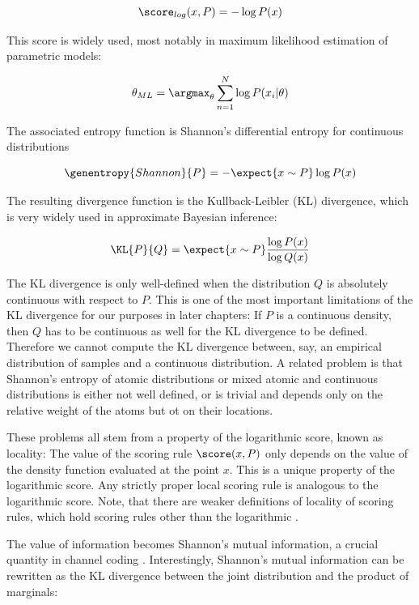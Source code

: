 \begin{equation}
	\score_{log}(x,P) = - \log P(x) 
\end{equation}

This score is widely used, most notably in maximum likelihood estimation of parametric models:

\begin{equation}
	\theta_{ML} = \argmax_{\theta} \sum_{n=1}^{N} \log P(x_i \vert \theta)
\end{equation}

The associated entropy function is Shannon's differential entropy for continuous distributions

\begin{equation}
	\genentropy{Shannon}{P} = - \expect{x\sim P} \log P(x)
\end{equation}

The resulting divergence function is the Kullback-Leibler (KL) divergence, which is very widely used in approximate Bayesian inference:

\begin{equation}
	\KL{P}{Q} = \expect{x\sim P} \frac{\log P(x)}{\log Q(x)}
\end{equation}

The KL divergence is only well-defined when the distribution $Q$ is absolutely continuous with respect to $P$. This is one of the most important limitations of the KL divergence for our purposes in later chapters: If $P$ is a continuous density, then $Q$ has to be continuous as well for the KL divergence to be defined. Therefore we cannot compute the KL divergence between, say, an empirical distribution of samples and a continuous distribution. A related problem is that Shannon's entropy of atomic distributions or mixed atomic and continuous distributions is either not well defined, or is trivial and depends only on the relative weight of the atoms but ot on their locations.

These problems all stem from a property of the logarithmic score, known as locality: The value of the scoring rule $\score(x,P)$ only depends on the value of the density function evaluated at the point $x$. This is a unique property of the logarithmic score. Any strictly proper local scoring rule is analogous to the logarithmic score. Note, that there are weaker definitions of locality of scoring rules, which hold scoring rules other than the logarithmic \citep{Parry2012, Dawid2012}.

The value of information becomes Shannon's mutual information, a crucial quantity in channel coding \citep{Shannon1948, MacKay2002}. Interestingly, Shannon's mutual information can be rewritten as the KL divergence between the joint distribution and the product of marginals:

